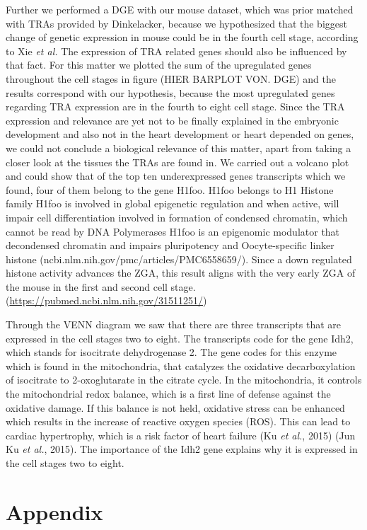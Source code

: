 \documentclass[
  parskip,
  oneside]{scrreprt}
\begin{document}
Further we performed a DGE with our mouse dataset, which was prior
matched with TRAs provided by Dinkelacker, because we hypothesized that
the biggest change of genetic expression in mouse could be in the fourth
cell stage, according to Xie \emph{et al.} The expression of TRA related
genes should also be influenced by that fact. For this matter we plotted
the sum of the upregulated genes throughout the cell stages in figure
(HIER BARPLOT VON. DGE) and the results correspond with our hypothesis,
because the most upregulated genes regarding TRA expression are in the
fourth to eight cell stage. Since the TRA expression and relevance are
yet not to be finally explained in the embryonic development and also
not in the heart development or heart depended on genes, we could not
conclude a biological relevance of this matter, apart from taking a
closer look at the tissues the TRAs are found in. We carried out a
volcano plot and could show that of the top ten underexpressed genes
transcripts which we found, four of them belong to the gene H1foo. H1foo
belongs to H1 Histone family H1foo is involved in global epigenetic
regulation and when active, will impair cell differentiation involved in
formation of condensed chromatin, which cannot be read by DNA
Polymerases H1foo is an epigenomic modulator that decondensed chromatin
and impairs pluripotency and Oocyte-specific linker histone
(ncbi.nlm.nih.gov/pmc/articles/PMC6558659/). Since a down regulated
histone activity advances the ZGA, this result aligns with the very
early ZGA of the mouse in the first and second cell stage.
(\url{https://pubmed.ncbi.nlm.nih.gov/31511251/})

Through the VENN diagram we saw that there are three transcripts that
are expressed in the cell stages two to eight. The transcripts code for
the gene Idh2, which stands for isocitrate dehydrogenase 2. The gene
codes for this enzyme which is found in the mitochondria, that catalyzes
the oxidative decarboxylation of isocitrate to 2-oxoglutarate in the
citrate cycle. In the mitochondria, it controls the mitochondrial redox
balance, which is a first line of defense against the oxidative damage.
If this balance is not held, oxidative stress can be enhanced which
results in the increase of reactive oxygen species (ROS). This can lead
to cardiac hypertrophy, which is a risk factor of heart failure (Ku
\emph{et al.}, 2015) (Jun Ku \emph{et al.}, 2015). The importance of the
Idh2 gene explains why it is expressed in the cell stages two to eight.

\hypertarget{appendix}{%
\chapter{Appendix}\label{appendix}}
\end{document}
